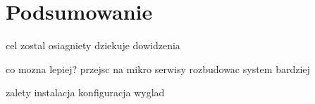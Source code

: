 \chapter{Podsumowanie}
cel zostal osiagniety dziekuje dowidzenia

co mozna lepiej?
przejsc na mikro serwisy
rozbudowac system bardziej


zalety
instalacja
konfiguracja
wyglad